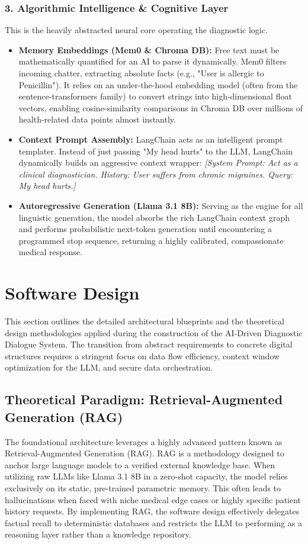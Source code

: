\documentclass[12pt]{article}
\begin{document}
\subsubsection{3. Algorithmic Intelligence \& Cognitive Layer}
This is the heavily abstracted neural core operating the diagnostic logic.
\begin{itemize}
    \item \textbf{Memory Embeddings (Mem0 \& Chroma DB):} Free text must be mathematically quantified for an AI to parse it dynamically. Mem0 filters incoming chatter, extracting absolute facts (e.g., "User is allergic to Penicillin"). It relies on an under-the-hood embedding model (often from the sentence-transformers family) to convert strings into high-dimensional float vectors, enabling cosine-similarity comparisons in Chroma DB over millions of health-related data points almost instantly.
    \item \textbf{Context Prompt Assembly:} LangChain acts as an intelligent prompt templater. Instead of just passing "My head hurts" to the LLM, LangChain dynamically builds an aggressive context wrapper: \textit{[System Prompt: Act as a clinical diagnostician. History: User suffers from chronic migraines. Query: My head hurts.]}
    \item \textbf{Autoregressive Generation (Llama 3.1 8B):} Serving as the engine for all linguistic generation, the model absorbs the rich LangChain context graph and performs probabilistic next-token generation until encountering a programmed stop sequence, returning a highly calibrated, compassionate medical response.
\end{itemize}

\newpage
\section{Software Design}

This section outlines the detailed architectural blueprints and the theoretical design methodologies applied during the construction of the AI-Driven Diagnostic Dialogue System. The transition from abstract requirements to concrete digital structures requires a stringent focus on data flow efficiency, context window optimization for the LLM, and secure data orchestration. 

\subsection{Theoretical Paradigm: Retrieval-Augmented Generation (RAG)}
The foundational architecture leverages a highly advanced pattern known as Retrieval-Augmented Generation (RAG). RAG is a methodology designed to anchor large language models to a verified external knowledge base. When utilizing raw LLMs like Llama 3.1 8B in a zero-shot capacity, the model relies exclusively on its static, pre-trained parametric memory. This often leads to hallucinations when faced with niche medical edge cases or highly specific patient history requests. By implementing RAG, the software design effectively delegates factual recall to deterministic databases and restricts the LLM to performing as a reasoning layer rather than a knowledge repository.
\end{document}

